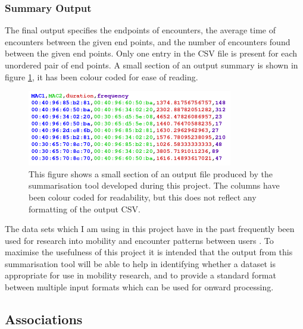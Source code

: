 \subsubsection{Summary Output}
The final output specifies the endpoints of encounters, the average time of encounters between the given end points, and the number of encounters found between the given end points. Only one entry in the CSV file is present for each unordered pair of end points. A small section of an output summary is shown in figure \ref{fig:output}, it has been colour coded for ease of reading.\newline
\begin{figure}[h]
    \centering
    \includegraphics[width=0.8\textwidth]{Output_Example_Coloured.png}
    \caption{This figure shows a small section of an output file produced by the summarisation tool developed during this project. The columns have been colour coded for readability, but this does not reflect any formatting of the output CSV.}
    \label{fig:output}
\end{figure}

The data sets which I am using in this project have in the past frequently been used for research into mobility and encounter patterns between users \cite{Scellato2011} \cite{Xiao2014} \cite{Hsu2010} \cite{Musolesi2009} \cite{Kosta2014} \cite{Kumar2009} \cite{Wei2013}. To maximise the usefulness of this project it is intended that the output from this  summarisation tool will be able to help in identifying whether a dataset is appropriate for use in mobility research, and to provide a standard format between multiple input formats which can be used for onward processing.

\subsection{Associations} 

